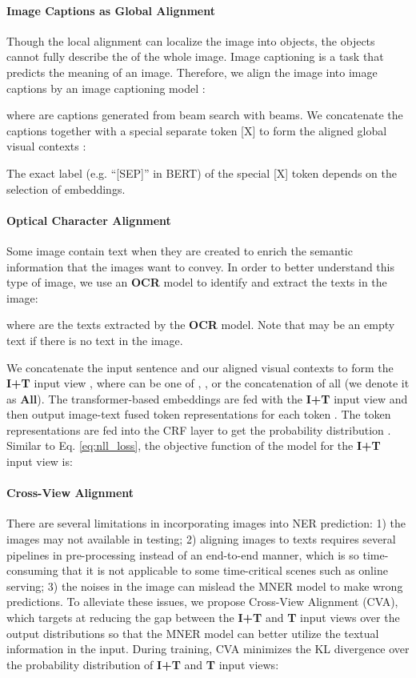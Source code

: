 \documentclass[11pt]{article}
\begin{document}
\paragraph{Image Captions as Global Alignment} Though the local alignment can localize the image into objects, the objects cannot fully describe the of the whole image. Image captioning is a task that predicts the meaning of an image. Therefore, we align the image into  image captions by an image captioning model :

where  are captions generated from beam search with  beams. We concatenate the  captions together with a special separate token [X] to form the aligned global visual contexts :

The exact label (e.g. ``[SEP]'' in BERT) of the special [X] token depends on the selection of embeddings.


\paragraph{Optical Character Alignment} Some image contain text when they are created to enrich the semantic information that the images want to convey. In order to better understand this type of image, we use an \textbf{OCR} model to identify and extract the texts in the image:

where  are the texts extracted by the \textbf{OCR} model. Note that  may be an empty text if there is no text in the image.

We concatenate the input sentence and our aligned visual contexts to form the \textbf{I+T} input view , where  can be one of , ,  or the concatenation of all (we denote it as \textbf{All}). The transformer-based embeddings are fed with the \textbf{I+T} input view and then output image-text fused token representations for each token . The token representations are fed into the CRF layer to get the probability distribution . Similar to Eq. \ref{eq:nll_loss}, the objective function of the model for the \textbf{I+T} input view is:

\paragraph{Cross-View Alignment}
There are several limitations in incorporating images into NER prediction: 1) the images may not available in testing; 2) aligning images to texts requires several pipelines in pre-processing instead of an end-to-end manner, which is so time-consuming that it is not applicable to some time-critical scenes such as online serving; 3) the noises in the image can mislead the MNER model to make wrong predictions. To alleviate these issues, we propose Cross-View Alignment (CVA), which targets at reducing the gap between the \textbf{I+T} and \textbf{T} input views over the output distributions so that the MNER model can better utilize the textual information in the input.
During training, CVA minimizes the KL divergence over the probability distribution of \textbf{I+T} and \textbf{T} input views:
\end{document}
